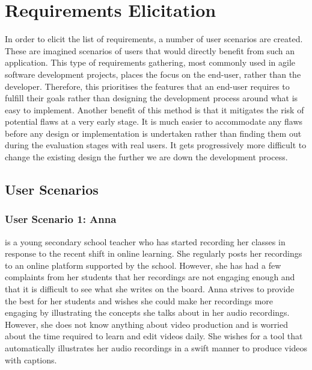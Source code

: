\documentclass{l4proj}
\begin{document}
\section{Requirements Elicitation}
In order to elicit the list of requirements, a number of user scenarios are created. These are imagined scenarios of users that would directly benefit from such an application. This type of requirements gathering, most commonly used in agile software development projects, places the focus on the end-user, rather than the developer. Therefore, this prioritises the features that an end-user requires to fulfill their goals rather than designing the development process around what is easy to implement. Another benefit of this method is that it mitigates the risk of potential flaws at a very early stage. It is much easier to accommodate any flaws before any design or implementation is undertaken rather than finding them out during the evaluation stages with real users. It gets progressively more difficult to change the existing design the further we are down the development process.


\subsection{User Scenarios}
\subsubsection{User Scenario 1: Anna} is a young secondary school teacher who has started recording her classes in response to the recent shift in online learning. She regularly posts her recordings to an online platform supported by the school. However, she has had a few complaints from her students that her recordings are not engaging enough and that it is difficult to see what she writes on the board. Anna strives to provide the best for her students and wishes she could make her recordings more engaging by illustrating the concepts she talks about in her audio recordings. However, she does not know anything about video production and is worried about the time required to learn and edit videos daily. She wishes for a tool that automatically illustrates her audio recordings in a swift manner to produce videos with captions.
\end{document}
